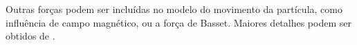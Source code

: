 Outras forças podem ser incluídas no modelo do movimento da partícula, como influência de campo magnético, ou a força de Basset. Maiores detalhes podem ser obtidos de \citet{crowe2012}.


%
%
%
%
%
%
%
%
%












